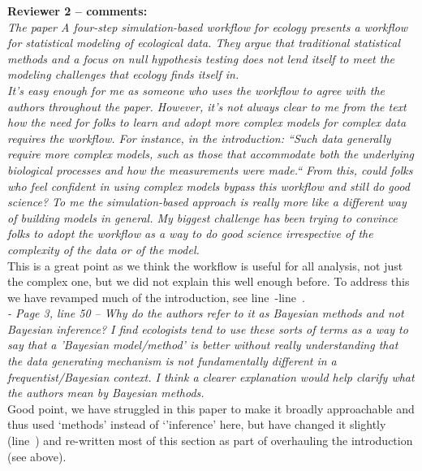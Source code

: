 \documentclass[11pt,a4paper]{article}
\newcommand{\lr}[1]{line~\lineref{#1}}
\begin{document}
{\bf Reviewer 2 -- comments:} \\

\emph{The paper A four-step simulation-based workflow for ecology presents a workflow for statistical modeling of ecological data. They argue that traditional statistical methods and a focus on null hypothesis testing does not lend itself to meet the modeling challenges that ecology finds itself in.}\\

\emph{It's easy enough for me as someone who uses the workflow to agree with the authors throughout the paper. However, it's not always clear to me from the text how the need for folks to learn and adopt more complex models for complex data requires the workflow. For instance, in the introduction: ``Such data generally require more complex models, such as those that accommodate both the underlying biological processes and how the measurements were made.`` From this, could folks who feel confident in using complex models bypass this workflow and still do good science? To me the simulation-based approach is really more like a different way of building models in general. My biggest challenge has been trying to convince folks to adopt the workflow as a way to do good science irrespective of the complexity of the data or of the model.}\\

This is a great point as we think the workflow is useful for all analysis, not just the complex one, but we did not explain this well enough before. To address this we have revamped much of the introduction, see 
\lr{newintrostart}-\lr{newintroend}. \\

\emph{- Page 3, line 50 -- Why do the authors refer to it as Bayesian methods and not Bayesian inference? I find ecologists tend to use these sorts of terms as a way to say that a 'Bayesian model/method' is better without really understanding that the data generating mechanism is not fundamentally different in a frequentist/Bayesian context. I think a clearer explanation would help clarify what the authors mean by Bayesian methods.}\\

Good point, we have struggled in this paper to make it broadly approachable and thus used `methods' instead of `'inference' here, but have changed it slightly (\lr{rrinference}) and re-written most of this section as part of overhauling the introduction (see above).\\
\end{document}
